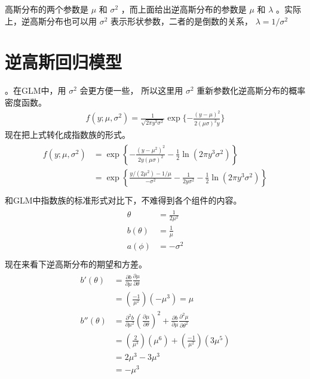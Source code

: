 \documentclass[letterpaper,10pt,english]{sphinxmanual}
\begin{document}
高斯分布的两个参数是 \(\mu\) 和 \(\sigma^2\)
，而上面给出逆高斯分布的参数是 \(\mu\) 和 \(\lambda\)
。实际上，逆高斯分布也可以用 \(\sigma^2\) 表示形状参数，二者的是倒数的关系，
\(\lambda=1/\sigma^2\)


\section{逆高斯回归模型}
\label{\detokenize{_u9006_u9ad8_u65af_u6a21_u578b/content:id3}}
。在GLM中，用 \(\sigma^2\) 会更方便一些，
所以这里用 \(\sigma^2\) 重新参数化逆高斯分布的概率密度函数。
\begin{equation}\label{equation:逆高斯模型/content:逆高斯模型/content:1}
\begin{split}f(y;\mu,\sigma^2) = \frac{1}{\sqrt{ 2\pi y^3 \sigma^2}  }
\exp \{  -\frac{(y-\mu)^2}{2(\mu\sigma)^2 y } \}\end{split}
\end{equation}
现在把上式转化成指数族的形式。
\begin{align}\label{equation:逆高斯模型/content:逆高斯模型/content:2}\!\begin{aligned}
f(y;\mu,\sigma^2) &=\exp \left \{
-\frac{ (y-\mu^2)^2 }{2y(\mu\sigma)^2}
-\frac{1}{2} \ln \left (  2\pi y^3 \sigma^2  \right )
\right \}\\
&= \exp \left \{
\frac{ y/(2\mu^2) -1/\mu}{-\sigma^2}
- \frac{1}{2y\sigma^2}
- \frac{ 1}{2 } \ln \left( 2\pi y^3 \sigma^2 \right)
\right \}\\
\end{aligned}\end{align}
和GLM中指数族的标准形式对比下，不难得到各个组件的内容。
\begin{align}\label{equation:逆高斯模型/content:逆高斯模型/content:3}\!\begin{aligned}
\theta &= \frac{1}{2\mu^2}\\
b(\theta) &= \frac{1}{\mu}\\
a(\phi) &= -\sigma^2\\
\end{aligned}\end{align}
现在来看下逆高斯分布的期望和方差。
\begin{align}\label{equation:逆高斯模型/content:逆高斯模型/content:4}\!\begin{aligned}
b'(\theta) &= \frac{\partial b}{\partial \mu} \frac{\partial \mu}{\partial \theta}\\
&=\left (  \frac{-1}{\mu^2} \right  ) (-\mu^3) = \mu\\
b''(\theta) &= \frac{\partial^2 b}{\partial \mu^2}
\left( \frac{\partial \mu}{\partial \theta}   \right )^2
+\frac{\partial b}{\partial \mu}
\frac{\partial^2 \mu }{\partial \theta^2}\\
&= \left ( \frac{2}{\mu^3} \right ) (\mu^6)
+ \left ( \frac{-1}{\mu^2} \right )(3\mu^5)\\
&= 2\mu^3 - 3\mu^3\\
&= -\mu^3\\
\end{aligned}\end{align}
\end{document}
